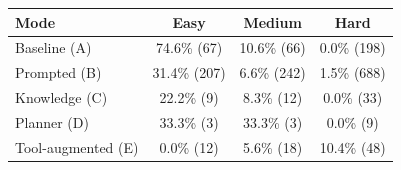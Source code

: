 \begin{tabular}{lccc}
\toprule
Mode & Easy & Medium & Hard \\
\midrule
Baseline (A) & 74.6\% (67) & 10.6\% (66) & 0.0\% (198) \\
Prompted (B) & 31.4\% (207) & 6.6\% (242) & 1.5\% (688) \\
Knowledge (C) & 22.2\% (9) & 8.3\% (12) & 0.0\% (33) \\
Planner (D) & 33.3\% (3) & 33.3\% (3) & 0.0\% (9) \\
Tool-augmented (E) & 0.0\% (12) & 5.6\% (18) & 10.4\% (48) \\
\bottomrule
\end{tabular}
